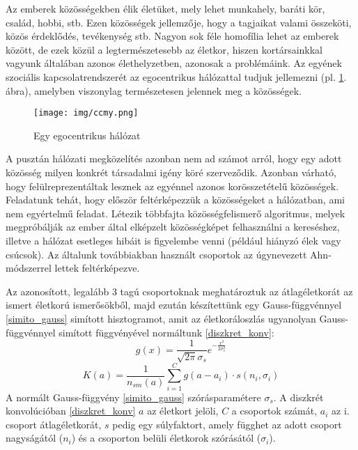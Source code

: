\documentclass[12pt]{article}
\begin{document}
Az emberek közösségekben élik életüket, mely lehet munkahely, baráti kör, család, hobbi, stb. Ezen közösségek jellemzője, hogy a tagjaikat valami összeköti, közös érdeklődés, tevékenység stb. Nagyon sok féle homofília lehet az emberek között, de ezek közül a legtermészetesebb az életkor, hiszen kortársainkkal vagyunk általában azonos élethelyzetben, azonosak a problémáink. Az egyének szociális kapcsolatrendszerét az egocentrikus hálózattal tudjuk jellemezni (pl. \ref{egocentrikus}. ábra), amelyben viszonylag természetesen jelennek meg a közösségek.
\begin{figure}[H]
	\centering
	\texttt{[image: img/ccmy.png]}
	\caption{Egy egocentrikus hálózat} %
	\label{egocentrikus}
\end{figure}
A pusztán hálózati megközelítés azonban nem ad számot arról, hogy egy adott közösség milyen konkrét társadalmi igény köré szerveződik. Azonban várható, hogy felülreprezentáltak lesznek az egyénnel azonos korösszetételű közösségek.
Feladatunk tehát, hogy először feltérképezzük a közösségeket a hálózatban, ami nem egyértelmű feladat. Létezik \iffalse TODO: létezik helyett valami más szó \fi többfajta közösségfelismerő algoritmus, melyek megpróbálják az ember által elképzelt közösségképet felhasználni a kereséshez, illetve a hálózat esetleges hibáit is figyelembe venni (például hiányzó élek vagy csúcsok). Az általunk továbbiakban használt csoportok az úgynevezett Ahn-módszerrel \cite{ahn2010link} \iffalse TODO: kell ez? \fi lettek feltérképezve.

Az azonosított, legalább 3 %
tagú csoportoknak meghatároztuk az átlagéletkorát az ismert életkorú ismerősökből, majd ezután készítettünk egy Gauss-függvénnyel \eqref{simito_gauss} simított hisztogramot, %
amit az életkoráloszlás ugyanolyan Gauss-függvénnyel simított függvényével normáltunk \eqref{diszkret_konv}:
\begin{equation} \label{simito_gauss}
	g(x) = \frac{1}{\sqrt{2\pi}\sigma_s} e^{-\frac{x^2}{2\sigma_s^2}}
\end{equation}
\begin{equation} \label{diszkret_konv}
	K(a) = \frac{1}{n_{sm}(a)}\sum_{i=1}^{C} g(a-a_i) \cdot s(n_{i}, \sigma_{i}) %
\end{equation} %
A normált Gauss-függvény \eqref{simito_gauss} szórásparamétere $\sigma_s$. A diszkrét konvolúcióban \eqref{diszkret_konv} $a$ az életkort jelöli, $C$ a csoportok számát, $a_i$ az i. csoport átlagéletkorát, $s$ pedig egy súlyfaktort, amely függhet az adott csoport nagyságától ($n_{i}$) és a csoporton belüli életkorok szórásától ($\sigma_i$).
\end{document}
